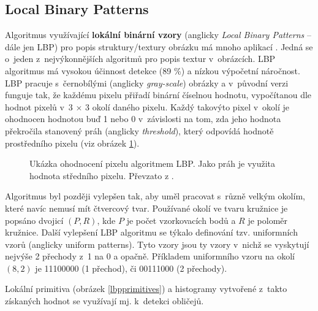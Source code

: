 \subsection*{Local Binary Patterns}
Algoritmus využívající \textbf{lokální binární vzory} (anglicky \emph{Local Binary Patterns} -- dále jen LBP) pro popis struktury/textury obrázku má mnoho aplikací \cite{localBinaryPatterns}. Jedná se o~jeden z~nejvýkonnějších algoritmů pro popis textur v~obrázcích. LBP algoritmus má vysokou účinnost detekce (89 \%) \cite{localBinaryPatternsTests} a nízkou výpočetní náročnost.
LBP pracuje s~černobílými (anglicky \emph{gray-scale}) obrázky a v~původní verzi funguje tak, že každému pixelu přiřadí binární číselnou hodnotu, vypočítanou dle hodnot pixelů v~3 $\times$ 3 okolí daného pixelu. Každý takovýto pixel v~okolí je ohodnocen hodnotou buď 1 nebo 0 v~závislosti na tom, zda jeho hodnota překročila stanovený práh (anglicky \emph{threshold}), který odpovídá hodnotě prostředního pixelu (viz obrázek \ref{lbp}).

\begin{figure}[H]
  \begin{center}
  \label{lbp}
  \caption{Ukázka ohodnocení pixelu algoritmem LBP. Jako práh je využita hodnota středního pixelu. Převzato z \cite{localBinaryPatterns}.}
  \end{center}
\end{figure}

Algoritmus byl později vylepšen tak, aby uměl pracovat s~různě velkým okolím, které navíc nemusí mít čtvercový tvar. Používané okolí ve tvaru kružnice je popsáno dvojicí $(P, R)$, kde $P$ je počet vzorkovacích bodů a $R$ je poloměr kružnice. Další vylepšení LBP algoritmu se týkalo definování tzv. uniformních vzorů (anglicky uniform patterns). Tyto vzory jsou ty vzory v~nichž se vyskytují nejvýše 2 přechody z~1 na 0 a opačně. Příkladem uniformního vzoru na okolí $(8, 2)$ je 11100000 (1 přechod), či 00111000 (2 přechody). 

Lokální primitiva (obrázek \ref{lbpprimitives}) a histogramy vytvořené z~takto získaných hodnot se využívají mj. k~detekci obličejů.

